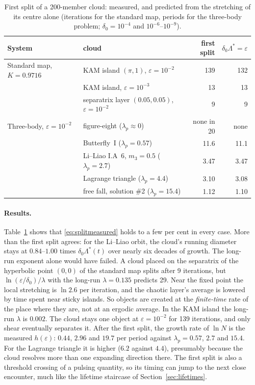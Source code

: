 \documentclass[11pt]{article}
\theoremstyle{remark}
\begin{document}
\begin{table}[h]
\centering
\begin{tabular}{@{}llrr@{}}
\toprule
System & cloud & first split & $\delta_0\Lambda^*=\varepsilon$\\
\midrule
Standard map, $K=0.9716$ & KAM island $(\pi,1)$, $\varepsilon=10^{-2}$ & 139 & 132\\
 & KAM island, $\varepsilon=10^{-3}$ & 13 & 13\\
 & separatrix layer $(0.05,0.05)$, $\varepsilon=10^{-2}$ & 9 & 9\\
Three-body, $\varepsilon=10^{-2}$ & figure-eight ($\lambda_p\approx0$) & none in 20 & none\\
 & Butterfly~I ($\lambda_p=0.57$) & 11.6 & 11.1\\
 & Li--Liao I.A~6, $m_3=0.5$ ($\lambda_p=2.7$) & 3.47 & 3.47\\
 & Lagrange triangle ($\lambda_p=4.4$) & 3.10 & 3.08\\
 & free fall, solution \#2 ($\lambda_p=15.4$) & 1.12 & 1.10\\
\bottomrule
\end{tabular}
\caption{First split of a 200-member cloud: measured, and predicted from the stretching of its centre alone
(iterations for the standard map, periods for the three-body problem; $\delta_0=10^{-4}$ and $10^{-6}$--$10^{-9}$).}
\label{tab:clouds}
\end{table}

\paragraph{Results.} Table~\ref{tab:clouds} shows that \eqref{eq:splitmeasured} holds to a few per cent in
every case. More than the first split agrees: for the Li--Liao orbit, the cloud's running diameter stays at
$0.84$--$1.00$ times $\delta_0\Lambda^*(t)$ over nearly six decades of growth. The long-run exponent alone would
have failed. A cloud placed on the separatrix of the hyperbolic point $(0,0)$ of the standard map splits after
9 iterations, but $\ln(\varepsilon/\delta_0)/\lambda$ with the long-run $\lambda=0.135$ predicts 29. Near the
fixed point the local stretching is $\ln2.6$ per iteration, and the chaotic layer's average is lowered by time
spent near sticky islands. So objects are created at the \emph{finite-time} rate of the place where they are,
not at an ergodic average. In the KAM island the long-run $\lambda$ is $0.002$. The cloud stays one object at
$\varepsilon=10^{-2}$ for 139 iterations, and only shear eventually separates it. After the first split, the
growth rate of $\ln N$ is the measured $h(\varepsilon)$: $0.44$, $2.96$ and $19.7$ per period against
$\lambda_p=0.57$, $2.7$ and $15.4$. For the Lagrange triangle it is higher ($6.2$ against $4.4$), presumably because the cloud resolves more
than one expanding direction there. The first split is also a threshold crossing of a pulsing quantity, so its timing can
jump to the next close encounter, much like the lifetime staircase of Section~\ref{sec:lifetimes}.
\end{document}
